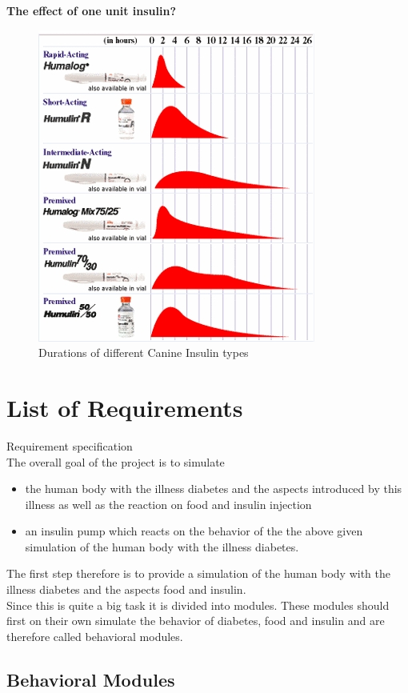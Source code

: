 \documentclass[pdflatex,a4paper,11pt,english]{scrreprt}
\begin{document}
\newpage

\textbf{The effect of one unit insulin?}

\begin{figure}[htb]
\centering
\includegraphics[scale=1]{images/time_activity}
\caption{Durations of different Canine Insulin types}
\end{figure}


\section{List of Requirements}
Requirement specification \\
The overall goal of the project is to simulate
\begin{itemize}
  \item the human body with the illness diabetes and the aspects introduced
  by this illness as well as the reaction on food and insulin injection
  \item an insulin pump which reacts on the behavior of the the above given
  simulation of the human body with the illness diabetes.
\end{itemize}

The first step therefore is to provide a simulation of the human body with the
illness diabetes and the aspects food and insulin. \\ 
Since this is quite a big task it is divided into modules. These modules should
first on their own simulate the behavior of diabetes, food and insulin and are
therefore called behavioral modules.

\subsection{Behavioral Modules}
\end{document}
